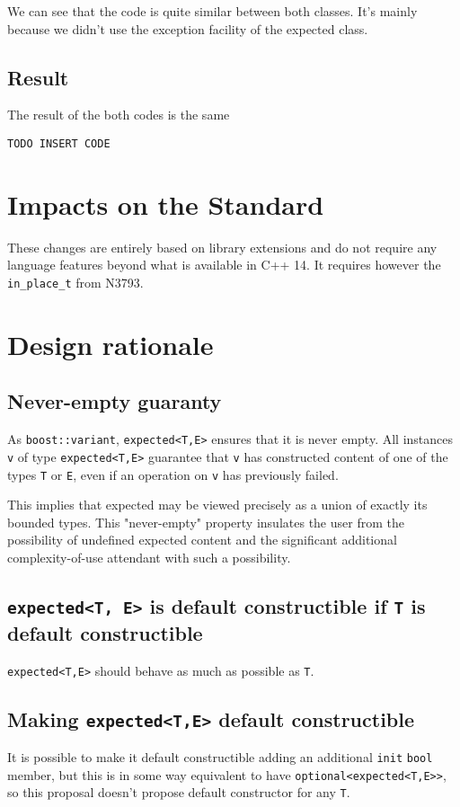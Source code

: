 \documentclass[a4paper,10pt]{article}
\newcommand{\cpp}[1]{\lstinline{#1}}
\begin{document}
We can see that the code is quite similar between both classes. It's mainly because we didn't use the exception facility of the expected class.

\subsection{Result}

The result of the both codes is the same 

\begin{lstlisting}
TODO INSERT CODE
\end{lstlisting}

\section{Impacts on the Standard}

These changes are entirely based on library extensions and do not require any language features beyond what is available in C++ 14. It requires however the \cpp{in_place_t} from N3793.

\section{Design rationale}


\subsection{Never-empty guaranty}
As \cpp{boost::variant}, \cpp{expected<T,E>} ensures that it is never empty.
All instances \cpp{v} of type \cpp{expected<T,E>} guarantee that \cpp{v} has constructed content of one of the types \cpp{T} or \cpp{E}, even if an operation on \cpp{v} has previously failed.

This implies that expected may be viewed precisely as a union of exactly its bounded types. This "never-empty" property insulates the user from the possibility of undefined expected content and the significant additional complexity-of-use attendant with such a possibility.

\subsection{\cpp{expected<T, E>} is default constructible if \cpp{T} is default constructible}

\cpp{expected<T,E>} should behave as much as possible as \cpp{T}. 

\subsection{Making \cpp{expected<T,E>} default constructible}
It is possible to make it default constructible adding an additional \cpp{init} \cpp{bool} member, but this is in some way equivalent to have \cpp{optional<expected<T,E>>}, so this proposal doesn't propose default constructor for any \cpp{T}.
\end{document}
